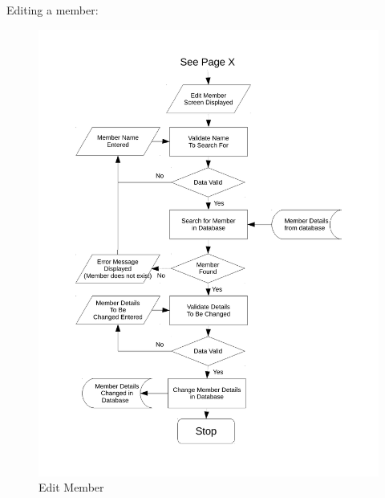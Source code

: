 Editing a member:
\begin{figure}[H]
\includegraphics[width=\textwidth]{./Design/images/FC_edit_member.pdf}
    \caption{Edit Member} \label{fig:Flow Chart Edit Member}
\end{figure}

